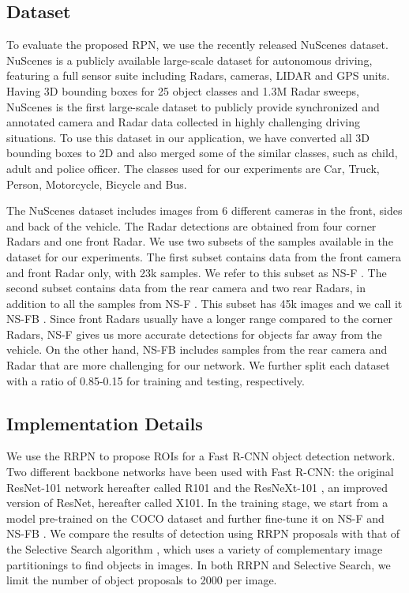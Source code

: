 \documentclass{article}
\newcommand{\dataset}{NuScenes }
\newcommand{\datasetF}{NS-F }
\newcommand{\datasetFB}{NS-FB }
\begin{document}
\subsection{Dataset}
To evaluate the proposed RPN, we use the recently released 
\dataset dataset. \dataset is a publicly available large-scale dataset for autonomous 
driving, featuring a full sensor suite including Radars, cameras, LIDAR and GPS 
units. Having 3D bounding boxes for 25 object classes and 1.3M Radar 
sweeps, \dataset is the first large-scale dataset to publicly provide 
synchronized and annotated camera and Radar data collected in highly 
challenging driving situations. To use this dataset in our application, 
we have converted all 3D bounding boxes to 2D 
and also merged some of the similar classes, such as child, adult and police officer. The 
classes used for our experiments are Car, Truck, Person, Motorcycle, Bicycle and Bus.

The \dataset dataset includes images from 6 different cameras in the front, sides and 
back of the vehicle. The Radar detections are obtained from four corner Radars and one 
front Radar. We use two subsets of the samples available in the dataset for our 
experiments. The first subset contains data from the front camera and front Radar only,
with 23k samples. We refer to this subset as \datasetF. The second subset contains data from 
the rear camera and two rear Radars, in addition to all the samples from \datasetF. This 
subset has 45k images and we call it \datasetFB.
Since front Radars usually have a longer range compared to the corner Radars, 
\datasetF gives us more accurate detections for objects far away from the vehicle. 
On the other hand, \datasetFB includes samples from the rear camera and Radar that 
are more challenging for our network. We further 
split each dataset with a ratio of 0.85-0.15 for training and testing, respectively.

\subsection{Implementation Details}
We use the RRPN to propose ROIs for a Fast R-CNN object detection network. 
Two different backbone networks have been used with 
Fast R-CNN: the original ResNet-101 network \cite{He_2016} hereafter 
called R101 and 
the ResNeXt-101 \cite{Xie_2017}, an improved version of ResNet, 
hereafter called X101. In the training stage, we start from a model pre-trained 
on the COCO dataset and further fine-tune it on \datasetF and 
\datasetFB . We compare the results of detection using RRPN proposals with that 
of the Selective Search algorithm \cite{ss2013}, 
which uses a variety of complementary image partitionings to find objects in images. In 
both RRPN and Selective Search, we limit the number of object proposals to 2000 per image.
\end{document}
